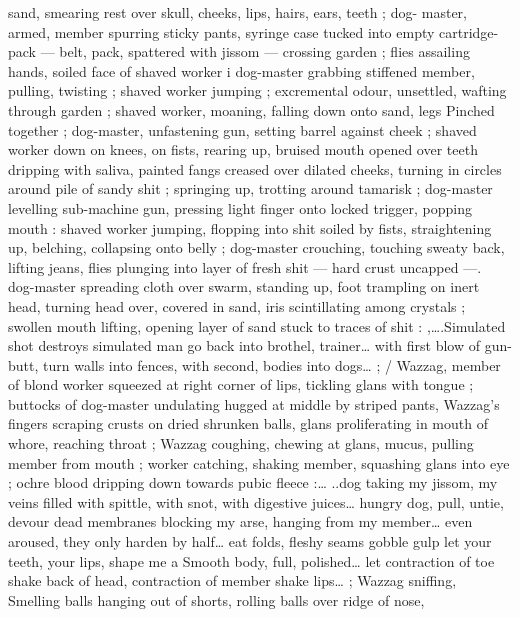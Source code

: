 sand, smearing rest over skull, cheeks, lips, hairs, ears, teeth ; dog- 
master, armed, member spurring sticky pants, syringe case tucked 
into empty cartridge-pack --- belt, pack, spattered with jissom --- 
crossing garden ; flies assailing hands, soiled face of shaved worker 
i dog-master grabbing stiffened member, pulling, twisting ; shaved 
worker jumping ; excremental odour, unsettled, wafting through 
garden ; shaved worker, moaning, falling down onto sand, legs 
Pinched together ; dog-master, unfastening gun, setting barrel 
against cheek ; shaved worker down on knees, on fists, rearing up, 
bruised mouth opened over teeth dripping with saliva, painted fangs 
creased over dilated cheeks, turning in circles around pile of sandy 
shit ; springing up, trotting around tamarisk ; dog-master levelling 
sub-machine gun, pressing light finger onto locked trigger, popping 
mouth : shaved worker jumping, flopping into shit soiled by fists, 
straightening up, belching, collapsing onto belly ; dog-master 
crouching, touching sweaty back, lifting jeans, flies plunging into 
layer of fresh shit --- hard crust uncapped ---. dog-master spreading 
cloth over swarm, standing up, foot trampling on inert head, turning 
head over, covered in sand, iris scintillating among crystals ; swollen 
mouth lifting, opening layer of sand stuck to traces of shit : 
{\gl},{\ldots}.Simulated shot destroys simulated man{\td} go back into brothel, 
trainer{\ldots} with first blow of gun-butt, turn walls into fences, with 
second, bodies into dogs{\ldots}{\td} {\gr} ; {\slash} Wazzag, member of blond worker 
squeezed at right corner of lips, tickling glans with tongue ; buttocks 
of dog-master undulating hugged at middle by striped pants, 
Wazzag's fingers scraping crusts on dried shrunken balls, glans 
proliferating in mouth of whore, reaching throat ; Wazzag coughing, 
chewing at glans, mucus, pulling member from mouth ; worker 
catching, shaking member, squashing glans into eye ; ochre blood 
dripping down towards pubic fleece :{\ldots} {\gl}..dog taking my jissom, my 
veins filled with spittle, with snot, with digestive juices{\ldots} hungry dog, 
pull, untie, devour dead membranes blocking my arse, hanging from 
my member{\ldots} even aroused, they only harden by half{\ldots} eat folds, 
fleshy seams{\td} gobble{\td} gulp{\td} let your teeth, your lips, shape me a 
Smooth body, full, polished{\ldots} let contraction of toe shake back of 
head, contraction of member shake lips{\ldots}{\gr} ; Wazzag sniffing, 
Smelling balls hanging out of shorts, rolling balls over ridge of nose, 
